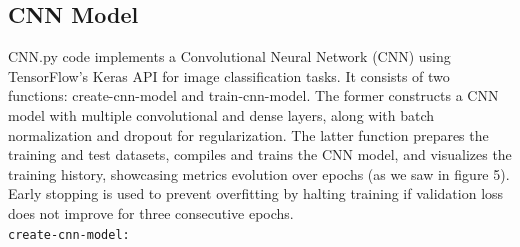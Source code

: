 \documentclass{article}
\newcommand{\code}[1]{\colorbox{light-gray}{\texttt{#1}}}
\begin{document}
\newpage
\subsection{CNN Model}
CNN.py code implements a Convolutional Neural Network (CNN) using TensorFlow's Keras API for image classification tasks. It consists of two functions: create-cnn-model and train-cnn-model. The former constructs a CNN model with multiple convolutional and dense layers, along with batch normalization and dropout for regularization. The latter function prepares the training and test datasets, compiles and trains the CNN model, and visualizes the training history, showcasing metrics evolution over epochs (as we saw in figure 5). Early stopping is used to prevent overfitting by halting training if validation loss does not improve for three consecutive epochs.\\\newline
\code{create-cnn-model:}
\end{document}
